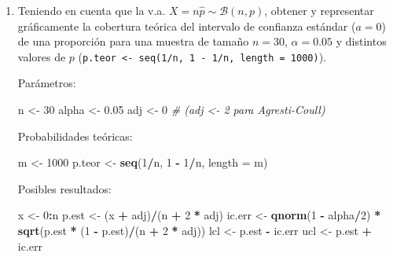 \documentclass[
]{book}
\newenvironment{Shaded}{\begin{snugshade}}{\end{snugshade}}
\newcommand{\CommentTok}[1]{\textcolor[rgb]{0.56,0.35,0.01}{\textit{#1}}}
\newcommand{\DataTypeTok}[1]{\textcolor[rgb]{0.13,0.29,0.53}{#1}}
\newcommand{\DecValTok}[1]{\textcolor[rgb]{0.00,0.00,0.81}{#1}}
\newcommand{\FloatTok}[1]{\textcolor[rgb]{0.00,0.00,0.81}{#1}}
\newcommand{\KeywordTok}[1]{\textcolor[rgb]{0.13,0.29,0.53}{\textbf{#1}}}
\newcommand{\NormalTok}[1]{#1}
\newcommand{\OperatorTok}[1]{\textcolor[rgb]{0.81,0.36,0.00}{\textbf{#1}}}
\newcommand{\StringTok}[1]{\textcolor[rgb]{0.31,0.60,0.02}{#1}}
\theoremstyle{break}
\theoremstyle{definition}
\theoremstyle{definition}
\theoremstyle{definition}
\theoremstyle{remark}
\begin{document}
\begin{enumerate}
\def\labelenumi{\alph{enumi})}
\item
  Teniendo en cuenta que la v.a. \(X=n\hat{p}\sim\mathcal{B}(n,p)\),
  obtener y representar gráficamente la cobertura teórica del
  intervalo de confianza estándar (\(a=0\)) de una proporción para
  una muestra de tamaño \(n=30\), \(\alpha=0.05\) y distintos valores
  de \(p\) (\texttt{p.teor\ \textless{}-\ seq(1/n,\ 1\ -\ 1/n,\ length\ =\ 1000)}).

  Parámetros:

\begin{Shaded}
\begin{Highlighting}[]
\NormalTok{n <-}\StringTok{ }\DecValTok{30}
\NormalTok{alpha <-}\StringTok{ }\FloatTok{0.05}
\NormalTok{adj <-}\StringTok{ }\DecValTok{0}  \CommentTok{# (adj <- 2 para Agresti-Coull)}
\end{Highlighting}
\end{Shaded}

  Probabilidades teóricas:

\begin{Shaded}
\begin{Highlighting}[]
\NormalTok{m <-}\StringTok{ }\DecValTok{1000}
\NormalTok{p.teor <-}\StringTok{ }\KeywordTok{seq}\NormalTok{(}\DecValTok{1}\OperatorTok{/}\NormalTok{n, }\DecValTok{1} \OperatorTok{-}\StringTok{ }\DecValTok{1}\OperatorTok{/}\NormalTok{n, }\DataTypeTok{length =}\NormalTok{ m) }
\end{Highlighting}
\end{Shaded}

  Posibles resultados:

\begin{Shaded}
\begin{Highlighting}[]
\NormalTok{x <-}\StringTok{ }\DecValTok{0}\OperatorTok{:}\NormalTok{n}
\NormalTok{p.est <-}\StringTok{ }\NormalTok{(x }\OperatorTok{+}\StringTok{ }\NormalTok{adj)}\OperatorTok{/}\NormalTok{(n }\OperatorTok{+}\StringTok{ }\DecValTok{2} \OperatorTok{*}\StringTok{ }\NormalTok{adj) }
\NormalTok{ic.err <-}\StringTok{ }\KeywordTok{qnorm}\NormalTok{(}\DecValTok{1} \OperatorTok{-}\StringTok{ }\NormalTok{alpha}\OperatorTok{/}\DecValTok{2}\NormalTok{) }\OperatorTok{*}\StringTok{ }\KeywordTok{sqrt}\NormalTok{(p.est }\OperatorTok{*}\StringTok{ }\NormalTok{(}\DecValTok{1} \OperatorTok{-}\StringTok{ }\NormalTok{p.est)}\OperatorTok{/}\NormalTok{(n }\OperatorTok{+}\StringTok{ }\DecValTok{2} \OperatorTok{*}\StringTok{ }\NormalTok{adj))  }
\NormalTok{lcl <-}\StringTok{ }\NormalTok{p.est }\OperatorTok{-}\StringTok{ }\NormalTok{ic.err }
\NormalTok{ucl <-}\StringTok{ }\NormalTok{p.est }\OperatorTok{+}\StringTok{ }\NormalTok{ic.err }
\end{Highlighting}
\end{Shaded}


\end{enumerate}
\end{document}
